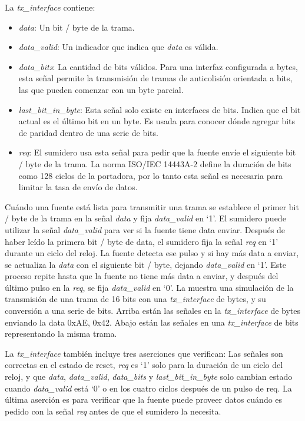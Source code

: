 \documentclass[a4paper, twoside, 11pt]{report}
\begin{document}
\FloatBarrier

La \textit{tx\_interface} contiene:

\begin{itemize}
  \item \textit{data}: Un bit / byte de la trama.
  \item \textit{data\_valid}: Un indicador que indica que \textit{data} es válida.
  \item \textit{data\_bits}: La cantidad de bits válidos. Para una interfaz configurada a bytes, esta señal permite la transmisión de tramas de anticolisión orientada a bits, las que pueden comenzar con un byte parcial.
  \item \textit{last\_bit\_in\_byte}: Esta señal solo existe en interfaces de bits. Indica que el bit actual es el último bit en un byte. Es usada para conocer dónde agregar bits de paridad dentro de una serie de bits.
  \item \textit{req}: El sumidero usa esta señal para pedir que la fuente envíe el siguiente bit / byte de la trama. La norma ISO/IEC 14443A-2 define la duración de bits como 128 ciclos de la portadora, por lo tanto esta señal es necesaria para limitar la tasa de envío de datos.
\end{itemize}

Cuándo una fuente está lista para transmitir una trama se establece el primer bit / byte de la trama en la señal \textit{data} y fija \textit{data\_valid} en ‘1’. El sumidero puede utilizar la señal \textit{data\_valid} para ver si la fuente tiene data enviar. Después de haber leído la primera bit / byte de data, el sumidero fija la señal \textit{req} en ‘1’ durante un ciclo del reloj. La fuente detecta ese pulso y si hay más data a enviar, se actualiza la \textit{data} con el siguiente bit / byte, dejando \textit{data\_valid} en ‘1’. Este proceso repite hasta que la fuente no tiene más data a enviar, y después del último pulso en la \textit{req}, se fija \textit{data\_valid} en ‘0’. La  muestra una simulación de la transmisión de una trama de 16 bits con una \textit{tx\_interface} de bytes, y su conversión a una serie de bits. Arriba están las señales en la \textit{tx\_interface} de bytes enviando la data 0xAE, 0x42. Abajo están las señales en una \textit{tx\_interface} de bits representando la misma trama.

La \textit{tx\_interface} también incluye tres aserciones que verifican: Las señales son correctas en el estado de reset, \textit{req} es ‘1’ solo para la duración de un ciclo del reloj, y que \textit{data}, \textit{data\_valid}, \textit{data\_bits} y \textit{last\_bit\_in\_byte} solo cambian estado cuando \textit{data\_valid} está ‘0’ o en los cuatro ciclos después de un pulso de req. La última aserción es para verificar que la fuente puede proveer datos cuándo es pedido con la señal \textit{req} antes de que el sumidero la necesita.
\end{document}
